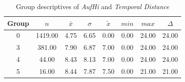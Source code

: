 \begin{table}[ht]
	\tiny
	\centering
    \begin{tabular}{c|c|c|c|c|c|c|c}
        \toprule
        Group & $n$ & $\bar{x}$ & $\sigma$ & $\tilde{x}$ & $min$ & $max$ & $\Delta$ \\ 
        \midrule
        0 & 1419.00 & 4.75 & 6.65 & 0.00 & 0.00 & 24.00 & 24.00 \\ 
        3 & 381.00 & 7.90 & 6.87 & 7.00 & 0.00 & 24.00 & 24.00 \\ 
        4 & 44.00 & 8.43 & 8.13 & 7.00 & 0.00 & 24.00 & 24.00 \\ 
        5 & 16.00 & 8.44 & 7.87 & 7.50 & 0.00 & 21.00 & 21.00 \\ 
        \bottomrule
      \end{tabular}
	\caption{Group descriptives of \textit{AufHi} and \textit{Temporal Distance}}
	\label{tbl:descriptives_baysis_matched_AufHi_TDist}
\end{table}

